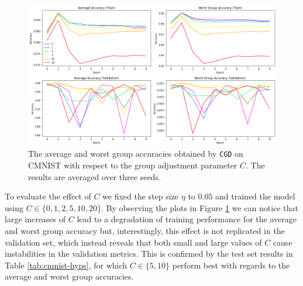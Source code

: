 \begin{figure}[H]
   \includegraphics[width=\textwidth]{media/cmnist-hyp-c.png}
   \centering
   \caption{The average and worst group accuracies obtained by \texttt{CGD} on CMNIST with respect to the group adjustment parameter $C$. The results are averaged over three seeds.}
   \label{fig:cmnist_hyp_c}
\end{figure}

To evaluate the effect of $C$ we fixed the step size $\eta$ to $0.05$ and trained the model using $C \in \{0,1,2,5,10,20\}$. By observing the plots in Figure \ref{fig:cmnist_hyp_c} we can notice that large increases of $C$ lead to a degradation of training performance for the average and worst group accuracy but, interestingly, this effect is not replicated in the validation set, which instead reveals that both small and large values of $C$ cause instabilities in the validation metrics. This is confirmed by the test set results in Table \ref{tab:cmnist-hyps}, for which $C \in \{5, 10\}$ perform best with regards to the average and worst group accuracies.

